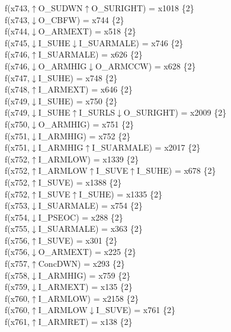 f(x743,$\uparrow$O\_SUDWN$\uparrow$O\_SURIGHT) = x1018 \{2\} \\  
f(x743,$\downarrow$O\_CBFW) = x744 \{2\} \\  
f(x744,$\downarrow$O\_ARMEXT) = x518 \{2\} \\  
f(x745,$\downarrow$I\_SUHE$\downarrow$I\_SUARMALE) = x746 \{2\} \\  
f(x746,$\uparrow$I\_SUARMALE) = x626 \{2\} \\  
f(x746,$\downarrow$O\_ARMHIG$\downarrow$O\_ARMCCW) = x628 \{2\} \\  
f(x747,$\downarrow$I\_SUHE) = x748 \{2\} \\  
f(x748,$\uparrow$I\_ARMEXT) = x646 \{2\} \\  
f(x749,$\downarrow$I\_SUHE) = x750 \{2\} \\  
f(x749,$\downarrow$I\_SUHE$\uparrow$I\_SURLS$\downarrow$O\_SURIGHT) = x2009 \{2\} \\  
f(x750,$\downarrow$O\_ARMHIG) = x751 \{2\} \\  
f(x751,$\downarrow$I\_ARMHIG) = x752 \{2\} \\  
f(x751,$\downarrow$I\_ARMHIG$\uparrow$I\_SUARMALE) = x2017 \{2\} \\  
f(x752,$\uparrow$I\_ARMLOW) = x1339 \{2\} \\  
f(x752,$\uparrow$I\_ARMLOW$\uparrow$I\_SUVE$\uparrow$I\_SUHE) = x678 \{2\} \\  
f(x752,$\uparrow$I\_SUVE) = x1388 \{2\} \\  
f(x752,$\uparrow$I\_SUVE$\uparrow$I\_SUHE) = x1335 \{2\} \\  
f(x753,$\downarrow$I\_SUARMALE) = x754 \{2\} \\  
f(x754,$\downarrow$I\_PSEOC) = x288 \{2\} \\  
f(x755,$\downarrow$I\_SUARMALE) = x363 \{2\} \\  
f(x756,$\uparrow$I\_SUVE) = x301 \{2\} \\  
f(x756,$\downarrow$O\_ARMEXT) = x225 \{2\} \\  
f(x757,$\uparrow$ConcDWN) = x293 \{2\} \\  
f(x758,$\downarrow$I\_ARMHIG) = x759 \{2\} \\  
f(x759,$\downarrow$I\_ARMEXT) = x135 \{2\} \\  
f(x760,$\uparrow$I\_ARMLOW) = x2158 \{2\} \\  
f(x760,$\uparrow$I\_ARMLOW$\downarrow$I\_SUVE) = x761 \{2\} \\  
f(x761,$\uparrow$I\_ARMRET) = x138 \{2\} \\  
